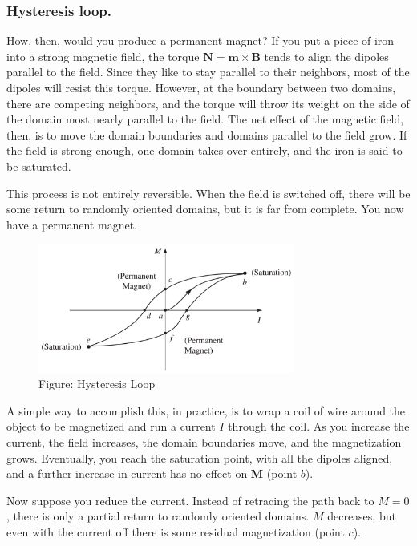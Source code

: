 \documentclass[../../../main.tex]{subfiles}
\begin{document}
\subsubsection*{Hysteresis loop.} How, then, would you produce a permanent magnet? If you put a piece of iron into a strong magnetic ﬁeld, the torque $\mathbf{N} = \mathbf{m} \times \mathbf{B}$ tends to align the dipoles parallel to the ﬁeld. Since they like to stay parallel to their neighbors, most of the dipoles will resist this torque. However, at the boundary between two domains, there are competing neighbors, and the torque will throw its weight on the side of the domain most nearly parallel to the ﬁeld. The net effect of the magnetic ﬁeld, then, is to move the domain boundaries and domains parallel to the ﬁeld grow. If the ﬁeld is strong enough, one domain takes over entirely, and the iron is said to be saturated.

This process is not entirely reversible. When the ﬁeld is switched off, there will be some return to randomly oriented domains, but it is far from complete. You now have a permanent magnet.

\begin{figure}
    \centering
    \includegraphics[width=0.75\textwidth]{../Rss/Electromagnetism/FieldInsideMatter/HysteresisLoop.png}
    \caption*{Figure: Hysteresis Loop}
\end{figure}

A simple way to accomplish this, in practice, is to wrap a coil of wire around the object to be magnetized and run a current $I$ through the coil. As you increase the current, the ﬁeld increases, the domain boundaries move, and the magnetization grows. Eventually, you reach the saturation point, with all the dipoles aligned, and a further increase in current has no effect on \textbf{M} (point $b$).

Now suppose you reduce the current. Instead of retracing the path back to $M = 0$, there is only a partial return to randomly oriented domains. $M$ decreases, but even with the current off there is some residual magnetization (point $c$). 
\end{document}
